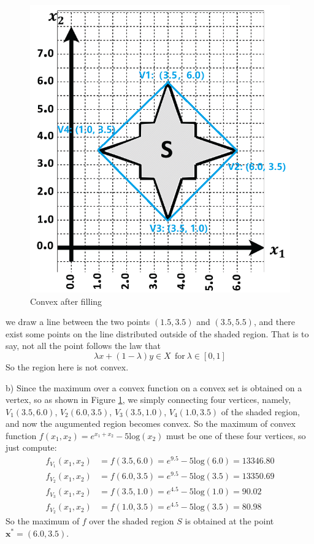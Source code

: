 \documentclass{article}
\begin{document}
\begin{figure}[htbp]
\begin{minipage}{5cm}
		\includegraphics[scale=0.5]{find_maximum.png}
		\caption{Convex after filling}
		\label{find the maximum}
	\end{minipage}		
\end{figure}
we draw a line between the two points $(1.5,3.5)$ and $(3.5, 5.5)$, and there exist some points on the line distributed outside of the shaded region. That is to say, not all the point follows the law that
\begin{equation}
	\lambda x + (1-\lambda)y \in X\ \ \mathrm{for}\ \lambda \in [0,1]
\end{equation}
So the region here is not convex.

b) Since the maximum over a convex function on a convex set is obtained on a vertex, so as shown in Figure \ref{find the maximum}, we simply connecting four vertices, namely, $V_1(3.5, 6.0)$, $V_2(6.0, 3.5)$, $V_3(3.5, 1.0)$, $V_4(1.0, 3.5)$ of the shaded region, and now the augumented region becomes convex. So the maximum of convex function $f(x_1, x_2) = e^{x_1+x_2} - 5\mathrm{log}(x_2)$ must be one of these four vertices, so just compute:
\begin{equation}
	\begin{aligned}
		f_{V_1}(x_1, x_2) &= f(3.5, 6.0) = e^{9.5} - 5\mathrm{log}(6.0) = 13346.80\\
		f_{V_2}(x_1, x_2) &= f(6.0, 3.5) = e^{9.5} - 5\mathrm{log}(3.5) = 13350.69\\
		f_{V_3}(x_1, x_2) &= f(3.5, 1.0) = e^{4.5} - 5\mathrm{log}(1.0) = 90.02\\
		f_{V_2}(x_1, x_2) &= f(1.0, 3.5) = e^{4.5} - 5\mathrm{log}(3.5) = 80.98
	\end{aligned}
\end{equation}
So the maximum of $f$ over the shaded region $S$ is obtained at the point $\bm{x}^* = (6.0, 3.5)$.
\end{document}
